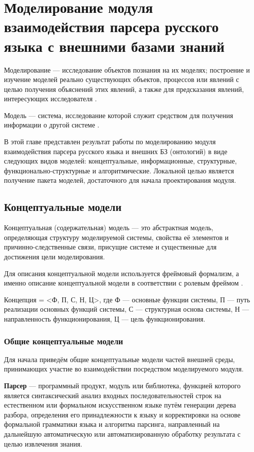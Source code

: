 \indent \section{Моделирование модуля взаимодействия парсера русского языка с внешними базами знаний}

Моделирование --- исследование объектов познания на их моделях; построение и изучение моделей реально существующих объектов, процессов или явлений с целью получения объяснений этих явлений, а также для предсказания явлений, интересующих исследователя \cite{wiki_modelling}.

Модель --- система, исследование которой служит средством для получения информации о другой системе \cite{uemov}.

В этой главе представлен результат работы по моделированию модуля взаимодействия парсера русского языка и внешних БЗ (онтологий) в виде следующих видов моделей: концептуальные, информационные, структурные, функционально-структурные и алгоритмические. Локальной целью является получение пакета моделей, достаточного для начала проектирования модуля.

\subsection{Концептуальные модели}

Концептуальная (содержательная) модель --- это абстрактная модель, определяющая структуру моделируемой системы, свойства её элементов и причинно-следственные связи, присущие системе и существенные для достижения цели моделирования.

Для описания концептуальной модели используется фреймовый формализм, а именно описание концептуальной модели в соответствии с ролевым фреймом \cite{gold}.

Концепция = <Ф, П, С, Н, Ц>, где Ф --- основные функции системы, П --- путь реализации основных функций системы, С --- структурная основа системы, Н --- направленность функционирования, Ц --- цель функционирования.

\subsubsection{Общие концептуальные модели}

Для начала приведём общие концептуальные модели частей внешней среды, принимающих участие во взаимодействии посредством моделируемого модуля.

\textbf{Парсер} --- программный продукт, модуль или библиотека, функцией которого является синтаксический анализ входных последовательностей строк на естественном или формальном искусственном языке путём генерации дерева разбора, определения его принадлежности к языку и корректировки на основе формальной грамматики языка и алгоритма парсинга, направленный на дальнейшую автоматическую или автоматизированную обработку результата с целью извлечения знания.

